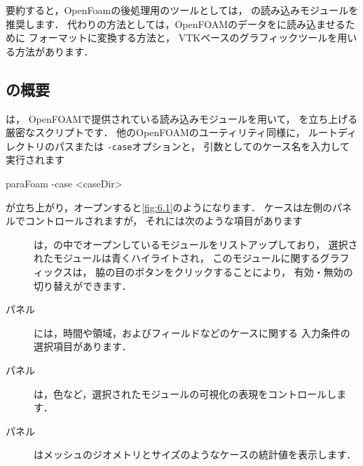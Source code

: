 要約すると，OpenFoamの後処理用のツールとしては，
の読み込みモジュールを推奨します．
代わりの方法としては，OpenFOAMのデータをに読み込ませるために
フォーマットに変換する方法と，
VTKベースのグラフィックツールを用いる方法があります．


\subsection{の概要}
\label{ssec:6.1.1}
は，
OpenFOAMで提供されている読み込みモジュールを用いて，
を立ち上げる厳密なスクリプトです．
他のOpenFOAMのユーティリティ同様に，
ルートディレクトリのパスまたは \texttt{-case}オプションと，
引数としてのケース名を入力して実行されます
\begin{OFverbatim}[terminal]
paraFoam -case <caseDir>
\end{OFverbatim}
が立ち上がり，オープンすると\autoref{fig:6.1}のようになります．
ケースは左側のパネルでコントロールされますが，
それには次のような項目があります
\begin{description}
 \item[]
%
%
            は，の中でオープンしているモジュールをリストアップしており，
            選択されたモジュールは青くハイライトされ，
            このモジュールに関するグラフィックスは，
            脇の目のボタンをクリックすることにより，
            有効・無効の切り替えができます．
 \item[パネル]
%
%
            には，時間や領域，およびフィールドなどのケースに関する
            入力条件の選択項目があります．
 \item[パネル]
%
%
            は，色など，選択されたモジュールの可視化の表現をコントロールします．
 \item[パネル]
%
%
            はメッシュのジオメトリとサイズのようなケースの統計値を表示します．
\end{description}


